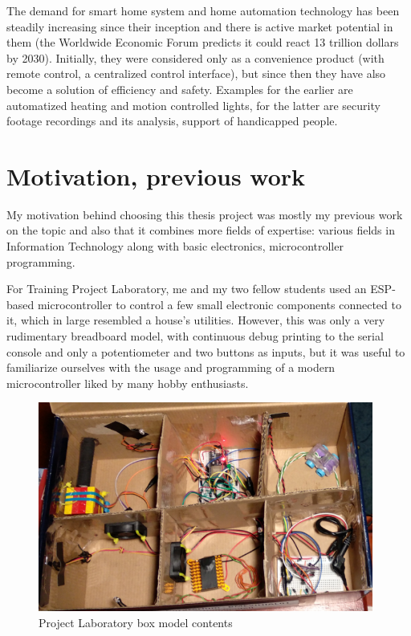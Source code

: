 The demand for smart home system and home automation technology has been steadily increasing since their inception and there is active market potential in them (the Worldwide Economic Forum predicts it could react 13 trillion dollars by 2030). Initially, they were considered only as a convenience product (with remote control, a centralized control interface), but since then they have also become a solution of efficiency and safety. Examples for the earlier are automatized heating and motion controlled lights, for the latter are security footage recordings and its analysis, support of handicapped people. \cite{ChakSHS}

\section{Motivation, previous work}

My motivation behind choosing this thesis project was mostly my previous work on the topic and also that it combines more fields of expertise: various fields in Information Technology along with basic electronics, microcontroller programming.

For Training Project Laboratory, me and my two fellow students used an ESP-based microcontroller to control a few small electronic components connected to it, which in large resembled a house's utilities. However, this was only a very rudimentary breadboard model, with continuous debug printing to the serial console and only a potentiometer and two buttons as inputs, but it was useful to familiarize ourselves with the usage and programming of a modern microcontroller liked by many hobby enthusiasts.

\begin{figure}[!ht]
    \centering
    \includegraphics[width=110mm, keepaspectratio]{figures/proj_lab_box.png}
    \caption{Project Laboratory box model contents}
    \label{fig:ProjLabBox}
\end{figure}

